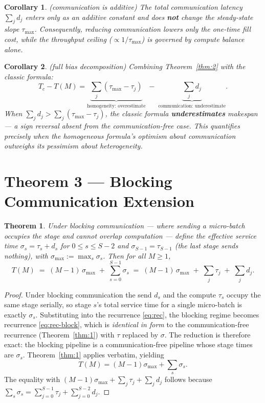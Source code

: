 \documentclass[11pt]{article}
\newtheorem{theorem}{Theorem}
\newtheorem{corollary}{Corollary}
\begin{document}
\begin{corollary}\label{cor:2}(communication is additive)
The total communication latency $\sum_j d_j$ enters only as an additive constant and does \textbf{not} change the steady-state slope $\tau_{\max}$. Consequently, reducing communication lowers only the one-time fill cost, while the throughput ceiling ($\propto 1/\tau_{\max}$) is governed by compute balance alone.
\end{corollary}

\begin{corollary}\label{cor:3}(full bias decomposition)
Combining Theorem~\ref{thm:2} with the classic formula:
\[
T_c - T(M) = \underbrace{\sum_j(\tau_{\max}-\tau_j)}_{\text{homogeneity: overestimate}} \;-\; \underbrace{\sum_j d_j}_{\text{communication: underestimate}} .
\]
When $\sum_j d_j > \sum_j(\tau_{\max}-\tau_j)$, the classic formula \textbf{underestimates} makespan --- a sign reversal absent from the communication-free case. This quantifies precisely when the homogeneous formula's optimism about communication outweighs its pessimism about heterogeneity.
\end{corollary}

\section{Theorem 3 --- Blocking Communication Extension}\label{sec:thm3}

\begin{theorem}\label{thm:3}
Under blocking communication --- where sending a micro-batch occupies the stage and cannot overlap computation --- define the effective service time $\sigma_s=\tau_s+d_s$ for $0\le s\le S-2$ and $\sigma_{S-1}=\tau_{S-1}$ (the last stage sends nothing), with $\sigma_{\max}:=\max_s\sigma_s$. Then for all $M\ge 1$,
\[
T(M) \;=\; (M-1)\,\sigma_{\max} \;+\; \sum_{s=0}^{S-1}\sigma_s
\;=\; (M-1)\,\sigma_{\max} \;+\; \sum_j\tau_j \;+\; \sum_j d_j .
\]
\end{theorem}

\begin{proof}
Under blocking communication the send $d_s$ and the compute $\tau_s$ occupy the same stage serially, so stage $s$'s total service time for a single micro-batch is exactly $\sigma_s$. Substituting into the recurrence \eqref{eq:rec}, the blocking regime becomes recurrence \eqref{eq:rec-block}, which is \emph{identical in form} to the communication-free recurrence (Theorem~\ref{thm:1}) with $\tau$ replaced by $\sigma$. The reduction is therefore exact: the blocking pipeline is a communication-free pipeline whose stage times are $\sigma_s$. Theorem~\ref{thm:1} applies verbatim, yielding
\[
T(M) = (M-1)\sigma_{\max} + \sum_s\sigma_s .
\]
The equality with $(M-1)\sigma_{\max}+\sum_j\tau_j+\sum_j d_j$ follows because $\sum_s\sigma_s = \sum_{j=0}^{S-1}\tau_j + \sum_{j=0}^{S-2}d_j$.
\end{proof}
\end{document}
